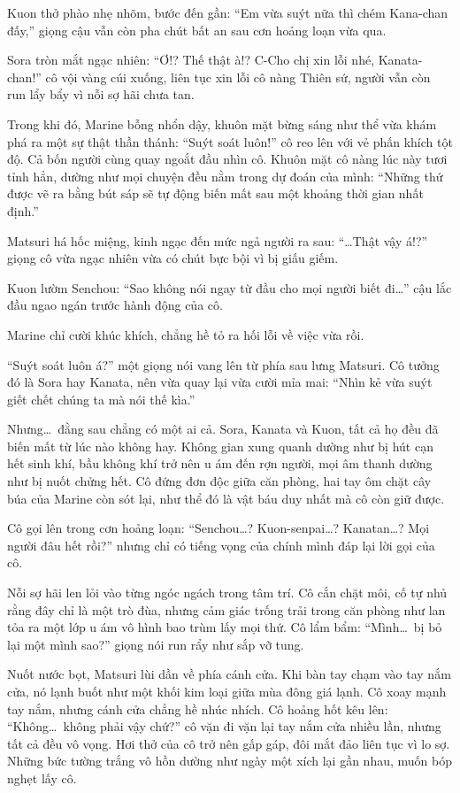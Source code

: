 \documentclass[../main.tex]{subfiles}
\begin{document}
Kuon thở phào nhẹ nhõm, bước đến gần: ``Em vừa suýt nữa thì chém Kana-chan đấy,'' giọng cậu vẫn còn pha chút bất an sau cơn hoảng loạn vừa qua.

Sora tròn mắt ngạc nhiên: ``Ơ!? Thế thật à!? C-Cho chị xin lỗi nhé, Kanata-chan!'' cô vội vàng cúi xuống, liên tục xin lỗi cô nàng Thiên sứ, người vẫn còn run lẩy bẩy vì nỗi sợ hãi chưa tan.

Trong khi đó, Marine bỗng nhổn dậy, khuôn mặt bừng sáng như thể vừa khám phá ra một sự thật thần thánh: ``Suýt soát luôn!'' cô reo lên với vẻ phấn khích tột độ. Cả bốn người cùng quay ngoắt đầu nhìn cô. Khuôn mặt cô nàng lúc này tươi tỉnh hẳn, dường như mọi chuyện đều nằm trong dự đoán của mình: ``Những thứ được vẽ ra bằng bút sáp sẽ tự động biến mất sau một khoảng thời gian nhất định.''

Matsuri há hốc miệng, kinh ngạc đến mức ngả người ra sau: ``\dots Thật vậy á!?'' giọng cô vừa ngạc nhiên vừa có chút bực bội vì bị giấu giếm.

Kuon lườm Senchou: ``Sao không nói ngay từ đầu cho mọi người biết đi\dots'' cậu lắc đầu ngao ngán trước hành động của cô.

Marine chỉ cười khúc khích, chẳng hề tỏ ra hối lỗi về việc vừa rồi.

``Suýt soát luôn á?'' một giọng nói vang lên từ phía sau lưng Matsuri. Cô tưởng đó là Sora hay Kanata, nên vừa quay lại vừa cười mỉa mai: ``Nhìn kẻ vừa suýt giết chết chúng ta mà nói thế kìa.''

Nhưng\dots\ đằng sau chẳng có một ai cả. Sora, Kanata và Kuon, tất cả họ đều đã biến mất từ lúc nào không hay. Không gian xung quanh dường như bị hút cạn hết sinh khí, bầu không khí trở nên u ám đến rợn người, mọi âm thanh dường như bị nuốt chửng hết. Cô đứng đơn độc giữa căn phòng, hai tay ôm chặt cây búa của Marine còn sót lại, như thể đó là vật báu duy nhất mà cô còn giữ được.

Cô gọi lên trong cơn hoảng loạn: ``Senchou\dots? Kuon-senpai\dots? Kanatan\dots? Mọi người đâu hết rồi?'' nhưng chỉ có tiếng vọng của chính mình đáp lại lời gọi của cô.

Nỗi sợ hãi len lỏi vào từng ngóc ngách trong tâm trí. Cô cắn chặt môi, cố tự nhủ rằng đây chỉ là một trò đùa, nhưng cảm giác trống trải trong căn phòng như lan tỏa ra một lớp u ám vô hình bao trùm lấy mọi thứ. Cô lẩm bẩm: ``Mình\dots\ bị bỏ lại một mình sao?'' giọng nói run rẩy như sắp vỡ tung.

Nuốt nước bọt, Matsuri lùi dần về phía cánh cửa. Khi bàn tay chạm vào tay nắm cửa, nó lạnh buốt như một khối kim loại giữa mùa đông giá lạnh. Cô xoay mạnh tay nắm, nhưng cánh cửa chẳng hề nhúc nhích. Cô hoảng hốt kêu lên: ``Không\dots\ không phải vậy chứ?'' cô vặn đi vặn lại tay nắm cửa nhiều lần, nhưng tất cả đều vô vọng. Hơi thở của cô trở nên gấp gáp, đôi mắt đảo liên tục vì lo sợ. Những bức tường trắng vô hồn dường như ngày một xích lại gần nhau, muốn bóp nghẹt lấy cô.
\end{document}

